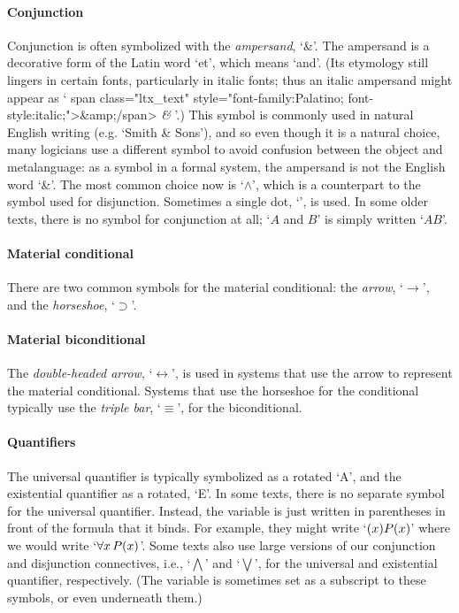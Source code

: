 \paragraph{Conjunction}
Conjunction is often symbolized with the \emph{ampersand}, `{\&}'. The ampersand is a decorative form of the Latin word `et', which means `and'.  (Its etymology still lingers in certain fonts, particularly in italic fonts; thus an italic ampersand might appear as `%
\iflatexml
\<span class="ltx\_text" style="font-family:Palatino; font-style:italic;">\&amp;\</span>
\else
\emph{\&}
\fi
'.) This symbol is commonly used in natural English writing (e.g.  `Smith \& Sons'), and so even though it is a natural choice, many logicians use a different symbol to avoid confusion between the object and metalanguage: as a symbol in a formal system, the ampersand is not the English word `\&'. The most common choice now is `$\wedge$', which is a counterpart to the symbol used for disjunction. Sometimes a single dot, `{\scriptsize\textbullet}', is used. In some older texts, there is no symbol for conjunction at all; `$A$ and $B$' is simply written `$AB$'.

\paragraph{Material conditional} There are two common symbols for the material conditional: the \emph{arrow}, `$\rightarrow$', and the \emph{horseshoe}, `$\supset$'.

\paragraph{Material biconditional} The \emph{double-headed arrow}, `$\leftrightarrow$', is used in systems that use the arrow to represent the material conditional. Systems that use the horseshoe for the conditional typically use the \emph{triple bar}, `$\equiv$', for the biconditional.

\paragraph{Quantifiers} The universal quantifier is typically
symbolized as a rotated `A', and the existential quantifier as a
rotated, `E'. In some texts, there is no separate symbol for the
universal quantifier. Instead, the variable is just written in
parentheses in front of the formula that it binds. For example, they
might write `$(x)\mathord{P}(x)$' where we would write `$\forall x\,
\mathord{P}(x)$'. Some texts also use large versions of our conjunction
and disjunction connectives, i.e., `$\bigwedge$' and `$\bigvee$', for
the universal and existential quantifier, respectively. (The variable
is sometimes set as a subscript to these symbols, or even underneath
them.)

